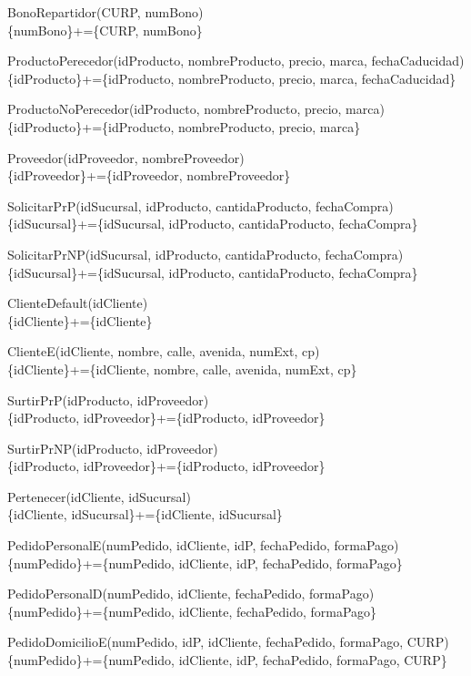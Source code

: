 \documentclass[a4paper, 12pt]{report}
\begin{document}
BonoRepartidor(CURP, numBono)\\
\{numBono\}+=\{CURP, numBono\}

ProductoPerecedor(idProducto, nombreProducto, precio, marca, fechaCaducidad)\\
\{idProducto\}+=\{idProducto, nombreProducto, precio, marca, fechaCaducidad\}

ProductoNoPerecedor(idProducto, nombreProducto, precio, marca)\\
\{idProducto\}+=\{idProducto, nombreProducto, precio, marca\}

Proveedor(idProveedor, nombreProveedor)\\
\{idProveedor\}+=\{idProveedor, nombreProveedor\}

SolicitarPrP(idSucursal, idProducto, cantidaProducto, fechaCompra)\\
\{idSucursal\}+=\{idSucursal, idProducto, cantidaProducto, fechaCompra\}

SolicitarPrNP(idSucursal, idProducto, cantidaProducto, fechaCompra)\\
\{idSucursal\}+=\{idSucursal, idProducto, cantidaProducto, fechaCompra\}

ClienteDefault(idCliente)\\
\{idCliente\}+=\{idCliente\}

ClienteE(idCliente, nombre, calle, avenida, numExt, cp)\\
\{idCliente\}+=\{idCliente, nombre, calle, avenida, numExt, cp\}

SurtirPrP(idProducto, idProveedor)\\
\{idProducto, idProveedor\}+=\{idProducto, idProveedor\}

SurtirPrNP(idProducto, idProveedor)\\
\{idProducto, idProveedor\}+=\{idProducto, idProveedor\}

Pertenecer(idCliente, idSucursal)\\
\{idCliente, idSucursal\}+=\{idCliente, idSucursal\}

PedidoPersonalE(numPedido, idCliente, idP, fechaPedido, formaPago)\\
\{numPedido\}+=\{numPedido, idCliente, idP, fechaPedido, formaPago\}

PedidoPersonalD(numPedido, idCliente, fechaPedido, formaPago)\\
\{numPedido\}+=\{numPedido, idCliente, fechaPedido, formaPago\}

PedidoDomicilioE(numPedido, idP, idCliente, fechaPedido, formaPago, CURP)\\
\{numPedido\}+=\{numPedido, idCliente, idP, fechaPedido, formaPago, CURP\}
\end{document}
